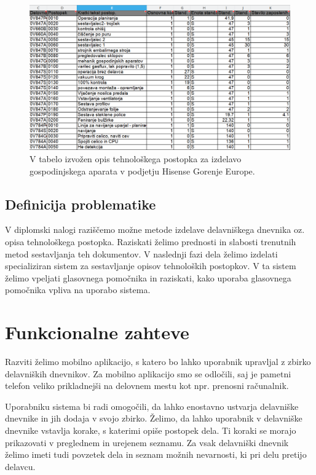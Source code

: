 \documentclass[a4paper, 12pt]{book}
\begin{document}
\begin{figure}[H]
\begin{center}
\includegraphics[width=13.5cm]{sap_2}
\end{center}
\caption{V tabelo izvožen opis tehnološkega postopka za izdelavo gospodinjskega aparata v podjetju Hisense Gorenje Europe.}
\label{sap_2}
\end{figure}

\subsection{Definicija problematike}

V diplomski nalogi raziščemo možne metode izdelave delavniškega dnevnika oz. opisa tehnološkega postopka.
Raziskati želimo prednosti in slabosti trenutnih metod sestavljanja teh dokumentov.
V naslednji fazi dela želimo izdelati specializiran sistem za sestavljanje opisov tehnoloških postopkov.
V ta sistem želimo vpeljati glasovnega pomočnika in raziskati, kako uporaba glasovnega pomočnika vpliva na uporabo sistema.

\section{Funkcionalne zahteve}

Razviti želimo mobilno aplikacijo, s katero bo lahko uporabnik upravljal z zbirko delavniških dnevnikov.
Za mobilno aplikacijo smo se odločili, saj je pametni telefon veliko prikladnejši na delovnem mestu kot npr. prenosni računalnik.

Uporabniku sistema bi radi omogočili, da lahko enostavno ustvarja delavniške dnevnike in jih dodaja v svojo zbirko.
Želimo, da lahko uporabnik v delavniške dnevnike vstavlja korake, s katerimi opiše postopek dela.
Ti koraki se morajo prikazovati v preglednem in urejenem seznamu.
Za vsak delavniški dnevnik želimo imeti tudi povzetek dela in seznam možnih nevarnosti, ki pri delu pretijo delavcu.
\end{document}
